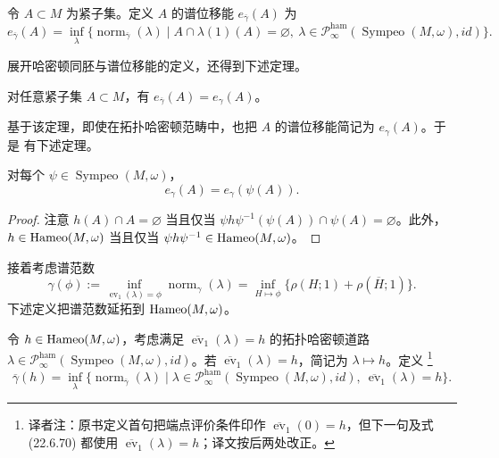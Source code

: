 \begin{definition}[谱位移能]
\label{def:22-topological-spectral-displacement-energy}
令 $A\subset M$ 为紧子集。定义 $A$ 的谱位移能 $e_{\overline\gamma}(A)$ 为
\[
 e_{\overline\gamma}(A)
 =\inf_\lambda\{\operatorname{norm}_{\overline\gamma}(\lambda)
 \mid A\cap\lambda(1)(A)=\varnothing,
 \ \lambda\in\mathcal P_\infty^{\mathrm{ham}}
 (\operatorname{Sympeo}(M,\omega),id)\}.
\]
\end{definition}

展开哈密顿同胚与谱位移能的定义，还得到下述定理。

\begin{theorem}
\label{thm:22-spectral-displacement-agreement}
对任意紧子集 $A\subset M$，有
$e_{\overline\gamma}(A)=e_\gamma(A)$。
\end{theorem}

基于该定理，即使在拓扑哈密顿范畴中，也把 $A$ 的谱位移能简记为 $e_\gamma(A)$。于是
有下述定理。

\begin{theorem}
\label{thm:22-spectral-displacement-invariance}
对每个 $\psi\in\operatorname{Sympeo}(M,\omega)$，
\[
 e_\gamma(A)=e_\gamma(\psi(A)).
\]
\end{theorem}

\begin{proof}
注意 $h(A)\cap A=\varnothing$ 当且仅当
$\psi h\psi^{-1}(\psi(A))\cap\psi(A)=\varnothing$。此外，
$h\in\operatorname{Hameo}(M,\omega)$ 当且仅当
$\psi h\psi^{-1}\in\operatorname{Hameo}(M,\omega)$。
\end{proof}

接着考虑谱范数
\[
 \gamma(\phi):=\inf_{\operatorname{ev}_1(\lambda)=\phi}
 \operatorname{norm}_\gamma(\lambda)
 =\inf_{H\mapsto\phi}\{\rho(H;1)+\rho(\overline H;1)\}.
\]
下述定义把谱范数延拓到 $\operatorname{Hameo}(M,\omega)$。

\begin{definition}[谱范数]
\label{def:22-generalized-spectral-norm}
令 $h\in\operatorname{Hameo}(M,\omega)$，考虑满足
$\overline{\operatorname{ev}}_1(\lambda)=h$ 的拓扑哈密顿道路
$\lambda\in\mathcal P_\infty^{\mathrm{ham}}
(\operatorname{Sympeo}(M,\omega),id)$。若
$\overline{\operatorname{ev}}_1(\lambda)=h$，简记为 $\lambda\mapsto h$。定义
\footnote{译者注：原书定义首句把端点评价条件印作
$\overline{\operatorname{ev}}_1(0)=h$，但下一句及式 (22.6.70) 都使用
$\overline{\operatorname{ev}}_1(\lambda)=h$；译文按后两处改正。}
\begin{equation}
 \overline\gamma(h)=\inf_\lambda
 \{\operatorname{norm}_{\overline\gamma}(\lambda)
 \mid \lambda\in\mathcal P_\infty^{\mathrm{ham}}
 (\operatorname{Sympeo}(M,\omega),id),
 \ \overline{\operatorname{ev}}_1(\lambda)=h\}.
 \label{eq:22-generalized-spectral-norm}
\end{equation}
\end{definition}

